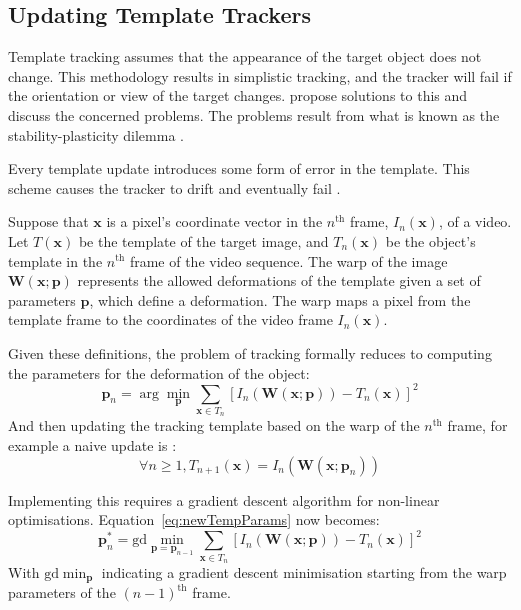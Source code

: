 \subsection{Updating Template Trackers}
  Template tracking \cite{templateUpdate} assumes that the appearance of the target object does not change.
  This methodology results in simplistic tracking, and the tracker will fail if the orientation or view of the target changes.
  \citet{templateUpdate} propose solutions to this and discuss the concerned problems.
  The problems result from what is known as the stability-plasticity dilemma \cite{grossberg1987}.

  Every template update introduces some form of error in the template.
  This scheme causes the tracker to drift and eventually fail \cite{templateUpdate}.

  Suppose that $\mathbf{x}$ is a pixel's coordinate vector in the $n^{\text{th}}$ frame, $I_n(\mathbf{x})$, of a video.
  Let $T(\mathbf{x})$ be the template of the target image, and $T_n(\mathbf{x})$ be the object's template in the $n^\text{th}$ frame of the video sequence.
  The warp of the image $\mathbf{W}(\mathbf{x};\mathbf{p})$ represents the allowed deformations of the template given a set of parameters $\mathbf{p}$, which define a deformation.
  The warp maps a pixel from the template frame to the coordinates of the video frame $I_n(\mathbf{x})$.

  Given these definitions, the problem of tracking formally reduces to computing the parameters for the deformation of the object:
  \begin{equation}
    \mathbf{p}_n = \arg \min_\mathbf{p} \sum_{\mathbf{x} \in T_n}\left[I_n(\mathbf{W}(\mathbf{x};\mathbf{p})) - T_n(\mathbf{x})\right]^2
    \label{eq:newTempParams}
  \end{equation}
  And then updating the tracking template based on the warp of the $n^\text{th}$ frame, for example a naive update is \cite{templateUpdate}:
  \begin{equation*}
    \forall n \geq 1, T_{n+1}(\mathbf{x}) = I_n(\mathbf{W}(\mathbf{x};\mathbf{p}_n))
  \end{equation*}

  Implementing this requires a gradient descent algorithm for non-linear optimisations.
  Equation~\ref{eq:newTempParams} now becomes:
  \begin{equation}
    \mathbf{p}_n^* = \mathrm{gd} \min_{\mathbf{p} = \mathbf{p}_{n-1}} \sum_{\mathbf{x} \in T_n}\left[I_n(\mathbf{W}(\mathbf{x};\mathbf{p})) - T_n(\mathbf{x})\right]^2
    \label{eq:paramUpdate}
  \end{equation}
  With $\mathrm{gd} \min_{\mathbf{p}}$ indicating a gradient descent minimisation starting from the warp parameters of the $(n-1)^\text{th}$ frame.
  
